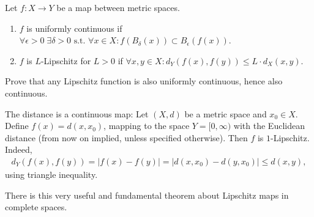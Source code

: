 \begin{definition}\label{def:unif_lipsch_cont}
	Let $f: X \to Y$ be a map between metric spaces.
	\begin{enumerate}
		\item $f$ is uniformly continuous if $\forall \epsilon > 0 \; \exists \delta > 0 \text{ s.t. } \forall x \in X: f(B_{\delta}(x)) \subset B_{\epsilon}(f(x))$.
		\item $f$ is $L$-Lipschitz for $L > 0$ if $\forall x,y \in X: d_{Y}(f(x),f(y)) \leq L \cdot d_{X}(x,y)$.
	\end{enumerate}
\end{definition}

\begin{lecexercise}
	Prove that any Lipschitz function is also uniformly continuous, hence also continuous.
\end{lecexercise}

\begin{eg}
	The distance is a continuous map: Let $(X,d)$ be a metric space and $x_{0} \in X$. Define $f(x) = d(x,x_{0})$, mapping to the space $Y = [0,\infty)$ with the Euclidean distance (from now on implied, unless specified otherwise). Then $f$ is $1$-Lipschitz. Indeed,
	\begin{align*}
		d_{Y}(f(x),f(y)) = \left| f(x) - f(y) \right| = \left| d(x,x_{0}) - d(y, x_{0}) \right| \leq d(x,y),
	\end{align*}
	using triangle inequality.
\end{eg}

There is this very useful and fundamental theorem about Lipschitz maps in complete spaces.

